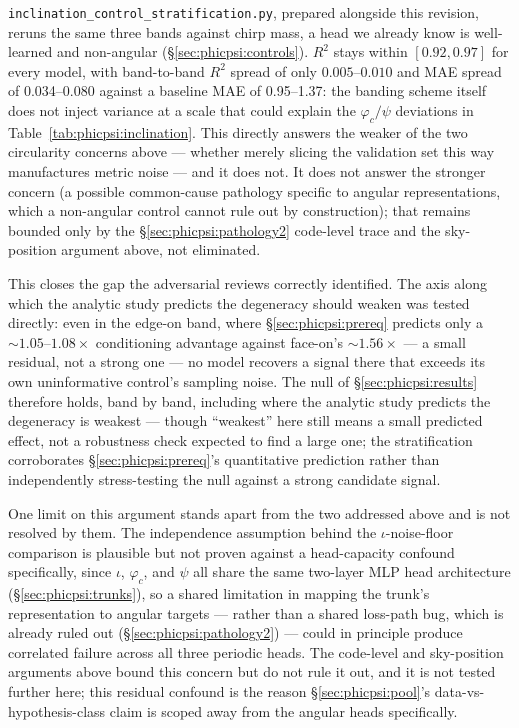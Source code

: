 \texttt{inclination\_control\_stratification.py}, prepared alongside this revision, reruns the same three bands against chirp mass, a head we already know is well-learned and non-angular (\S\ref{sec:phicpsi:controls}).
$R^2$ stays within $[0.92, 0.97]$ for every model, with band-to-band $R^2$ spread of only $0.005$--$0.010$ and MAE spread of \SIrange{0.034}{0.080}{\solarmass} against a baseline MAE of \SIrange{0.95}{1.37}{\solarmass}: the banding scheme itself does not inject variance at a scale that could explain the $\varphi_c/\psi$ deviations in Table~\ref{tab:phicpsi:inclination}.
This directly answers the weaker of the two circularity concerns above --- whether merely slicing the validation set this way manufactures metric noise --- and it does not.
It does not answer the stronger concern (a possible common-cause pathology specific to angular representations, which a non-angular control cannot rule out by construction); that remains bounded only by the \S\ref{sec:phicpsi:pathology2} code-level trace and the sky-position argument above, not eliminated.

This closes the gap the adversarial reviews correctly identified.
The axis along which the analytic study predicts the degeneracy should weaken was tested directly: even in the edge-on band, where \S\ref{sec:phicpsi:prereq} predicts only a $\sim 1.05$--$1.08\times$ conditioning advantage against face-on's $\sim 1.56\times$ --- a small residual, not a strong one --- no model recovers a signal there that exceeds its own uninformative control's sampling noise.
The null of \S\ref{sec:phicpsi:results} therefore holds, band by band, including where the analytic study predicts the degeneracy is weakest --- though ``weakest'' here still means a small predicted effect, not a robustness check expected to find a large one; the stratification corroborates \S\ref{sec:phicpsi:prereq}'s quantitative prediction rather than independently stress-testing the null against a strong candidate signal.

One limit on this argument stands apart from the two addressed above and is not resolved by them.
The independence assumption behind the $\iota$-noise-floor comparison is plausible but not proven against a head-capacity confound specifically, since $\iota$, $\varphi_c$, and $\psi$ all share the same two-layer MLP head architecture (\S\ref{sec:phicpsi:trunks}), so a shared limitation in mapping the trunk's representation to angular targets --- rather than a shared loss-path bug, which is already ruled out (\S\ref{sec:phicpsi:pathology2}) --- could in principle produce correlated failure across all three periodic heads.
The code-level and sky-position arguments above bound this concern but do not rule it out, and it is not tested further here; this residual confound is the reason \S\ref{sec:phicpsi:pool}'s data-vs-hypothesis-class claim is scoped away from the angular heads specifically.